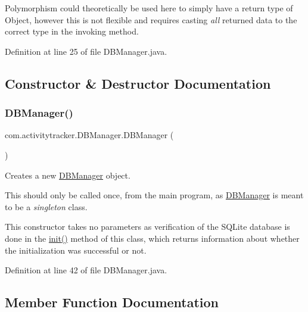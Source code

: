 Polymorphism could theoretically be used here to simply have a return type of Object, however this is not flexible and requires casting {\itshape all} returned data to the correct type in the invoking method. 

Definition at line 25 of file D\+B\+Manager.\+java.



\subsection{Constructor \& Destructor Documentation}
\mbox{\label{classcom_1_1activitytracker_1_1_d_b_manager_ac1f558ef56fe02d74fe103a473a15bb5}} 
\subsubsection{\texorpdfstring{D\+B\+Manager()}{DBManager()}}
{\footnotesize\ttfamily com.\+activitytracker.\+D\+B\+Manager.\+D\+B\+Manager (\begin{DoxyParamCaption}{ }\end{DoxyParamCaption})\hspace{0.3cm}{\ttfamily [package]}}

Creates a new \mbox{\hyperlink{classcom_1_1activitytracker_1_1_d_b_manager}{D\+B\+Manager}} object.

This should only be called once, from the main program, as \mbox{\hyperlink{classcom_1_1activitytracker_1_1_d_b_manager}{D\+B\+Manager}} is meant to be a {\itshape singleton} class.

This constructor takes no parameters as verification of the S\+Q\+Lite database is done in the \mbox{\hyperlink{classcom_1_1activitytracker_1_1_d_b_manager_a41df4600bb5901a26a4ea6a7108a70b9}{init()}} method of this class, which returns information about whether the initialization was successful or not. 

Definition at line 42 of file D\+B\+Manager.\+java.



\subsection{Member Function Documentation}
\mbox{\label{classcom_1_1activitytracker_1_1_d_b_manager_a39ef296348c7bfacf965b3417655f4e5}} 

